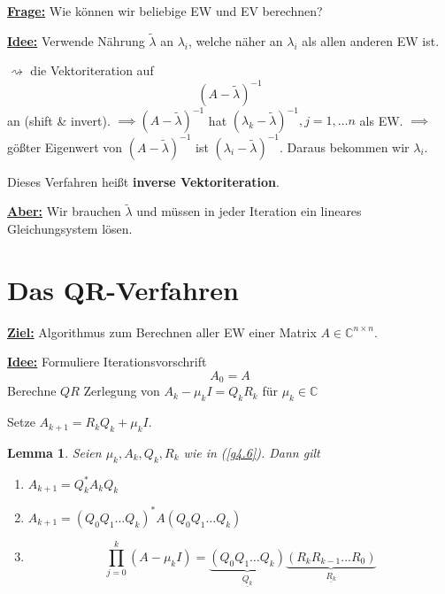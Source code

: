 \documentclass{book}
\newtheorem{lemma}[algorithm]{Lemma}
\def\C{\mathbb{C}}
\begin{document}
            \underline{\textbf{Frage:}} Wie können wir beliebige EW und EV berechnen?

            \underline{\textbf{Idee:}} Verwende Nährung $\tilde\lambda$ an $\lambda_i$, welche 
            näher an $\lambda_i$ als allen anderen EW ist.

            $\rightsquigarrow$ die Vektoriteration auf 
            \[\left(A-\tilde\lambda\right)^{-1}\]
            an (shift \& invert). $\implies \left(A-\tilde\lambda\right)^{-1}$ hat $(\lambda_k-\tilde\lambda)^{-1}, j=1,\dots n$
            als EW. $\implies $ gößter Eigenwert von $\left(A-\tilde\lambda\right)^{-1}$ ist $(\lambda_i-\tilde\lambda)^{-1}$. Daraus bekommen wir $\lambda_i$.

            Dieses Verfahren heißt \textbf{inverse Vektoriteration}.

            \underline{\textbf{Aber:}} Wir brauchen $\tilde\lambda$ und müssen in jeder Iteration ein lineares Gleichungsystem lösen.


        \section{Das QR-Verfahren}

            \underline{\textbf{Ziel:}} Algorithmus zum Berechnen aller EW einer Matrix $A\in\C^{n\times n}$.

            \underline{\textbf{Idee:}} Formuliere Iterationsvorschrift
            \begin{equation}\label{g4.6} %
            A_0=A
            \end{equation}
            Berechne $QR$ Zerlegung von $A_k-\mu_kI=Q_kR_k$ für $\mu_k\in \C$

            Setze $A_{k+1}=R_kQ_k+\mu_kI$.

            \begin{lemma}\label{l4.15}
                Seien $\mu_k,A_k,Q_k,R_k$ wie in (\ref{g4.6}). Dann gilt 
                \begin{enumerate}
                    \item $A_{k+1}=Q^*_kA_kQ_k$
                    \item $A_{k+1}=(Q_0Q_1\dots Q_k)^*A(Q_0Q_1\dots Q_k)$
                    \item \[\prod_{j=0}^k (A-\mu_k I) = \underbrace{(Q_0Q_1\dots Q_k)}_{\underline{Q_k}}\underbrace{(R_{k}R_{k-1}\dots R_0)}_{\underline{R_k}}\]
                \end{enumerate}
            \end{lemma}
\end{document}

